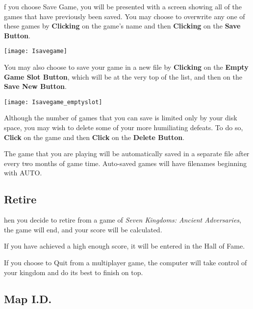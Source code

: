 
f you choose Save Game, you will be presented with a screen showing all of the games that have previously been saved. You may choose to overwrite any one of these games by \textbf{Clicking} on the game’s name and then \textbf{Clicking} on the \textbf{Save Button}.

\begin{center}
    \texttt{[image: Isavegame]} %
\end{center}

You may also choose to save your game in a new file by \textbf{Clicking} on the \textbf{Empty Game Slot Button}, which will be at the very top of the list, and then on the \textbf{Save New Button}.

\begin{center}
    \texttt{[image: Isavegame\_emptyslot]} %
\end{center}

Although the number of games that you can save is limited only by your disk space, you may wish to delete some of your more humiliating defeats. To do so, \textbf{Click} on the game and then \textbf{Click} on the \textbf{Delete Button}.


The game that you are playing will be automatically saved in a separate file after every two months of game time. Auto-saved games will have filenames beginning with AUTO.

\subsection{Retire}


hen you decide to retire from a game of \textit{Seven Kingdoms: Ancient Adversaries}, the game will end, and your score will be calculated.

If you have achieved a high enough score, it will be entered in the Hall of Fame.

If you choose to Quit from a multiplayer game, the computer will take control of your kingdom and do its best to finish on top.

\subsection{Map I.D.}

